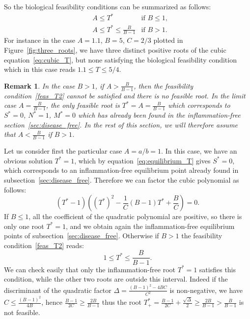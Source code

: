 \documentclass[a4paper, 12pt]{article}
\newtheorem{rem}{Remark}[section]
\begin{document}
So the biological feasibility conditions can be summarized as follows:
\begin{align}
&A  \leq  T^*   &\text{if } B \leq 1, \label{feas_T1} \\
&A  \leq  T^*   \leq  \frac{B}{B-1}&  \text{if } B > 1. \label{feas_T2}
\end{align}
For instance in the case $A=1.1$, $B=5$, $C=2/3$ plotted in Figure~\ref{fig:three_roots}, we have three distinct positive roots of the cubic equation~\eqref{eq:cubic_T},
but none satisfying the biological feasibility condition which  in this case reads $1.1 \leq T \leq 5/4$.%
\begin{rem}\label{rem:feasibility}
In the case $B>1$, if $A > \frac{B}{B-1}$, then     the feasibility condition~\eqref{feas_T2} cannot be satisfied and there is no feasible root. In the limit case $A = \frac{B}{B-1}$, the only feasible root is $T^* = A = \frac{B}{B-1}$
 which corresponds to $S^* = 0$, $N^* = 1$, $M^* = 0$ which has already been found in the inflammation-free section~\ref{sec:disease_free}. 
 \emph{In the rest of this section, we will therefore assume that $A < \frac{B}{B-1}$ if $B > 1$}.
\end{rem}
Let us consider first the particular case $A = a/b = 1$. In this case, we have an obvious solution $T^* = 1$, which by equation~\eqref{eq:equilibrium_T} gives  $S^* = 0$,
which corresponds to an inflammation-free equilibrium point already found in subsection~\ref{sec:disease_free}.
Therefore we can factor the cubic polynomial as follows:
    \begin{equation}
    (T^* - 1) \left( {(T^*)}^2 - \frac{1}{C} (B - 1) T^* + \frac{B}{C} \right) = 0.
    \label{eq:factored_cubic}
    \end{equation}
 If $B \leq 1$, all the coefficient of the quadratic polynomial are positive, so there is only one root $T^* = 1$, and we obtain again the inflammation-free equilibrium points of subsection~\ref{sec:disease_free}. 
 Otherwise if $B>1$ the feasibility condition~\eqref{feas_T2} reads:
\begin{equation}
1 \leq T^* \leq \frac{B}{B-1}.
\end{equation}
 We can check easily that only the inflammation-free root $T^* = 1$ satisfies this condition, while the other two roots are outside this interval.
 Indeed if the discriminant of the quadratic factor $\Delta = \frac{{(B-1)}^2 - 4BC}{C^2}$ is non-negative, we have $C \leq \frac{{(B-1)}^2}{4B}$, 
 hence $\frac{B-1}{2C} \geq  \frac{2B}{B-1}$ thus the root $T_+^* = \frac{B-1}{2C} + \frac{\sqrt{\Delta}}{2} \geq \frac{2B}{B-1} > \frac{B}{B-1}  $ is not feasible.
\end{document}
